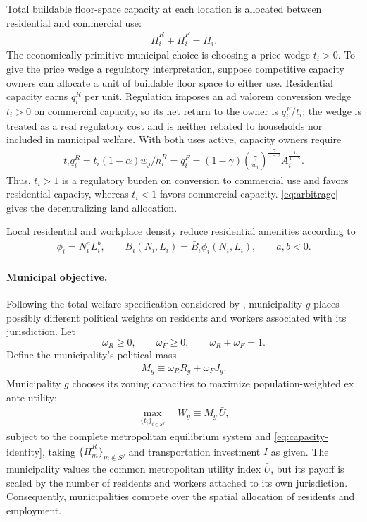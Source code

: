 \documentclass[12pt, a4paper]{article}
\theoremstyle{definition}
\theoremstyle{remark}
\begin{document}
Total buildable floor-space capacity at each location is allocated between residential and commercial use:
\begin{align}
    \label{eq:capacity-identity}
    \bar H_i^R+\bar H_i^F=\bar H_i.
\end{align}
The economically primitive municipal choice is choosing a price wedge $t_i>0$. To give the price wedge a regulatory interpretation, suppose competitive capacity owners can allocate a unit of buildable floor space to either use. Residential capacity earns $q_i^R$ per unit. Regulation imposes an ad valorem conversion wedge $t_i>0$ on commercial capacity, so its net return to the owner is $q_i^F/t_i$; the wedge is treated as a real regulatory cost and is neither rebated to households nor included in municipal welfare\citep{Glaeser2002-vq}. With both uses active, capacity owners require
\begin{align}
    \label{eq:arbitrage}
     t_{i}q_{i}^{R} = t_{i}(1-\alpha)w_{j}/h_{i}^{R}=q_{i}^{F}=
     (1-\gamma)\left(\frac{\gamma}{w_{i}}\right)^{\frac{\gamma}{1-\gamma}}A_{i}^{\frac{1}{1-\gamma}}.
\end{align}
Thus, $t_i>1$ is a regulatory burden on conversion to commercial use and favors residential capacity, whereas $t_i<1$ favors commercial capacity. \eqref{eq:arbitrage} gives the decentralizing land allocation.

Local residential and workplace density reduce residential amenities according to
\begin{align}
    \label{eq:local-congestion}
    \phi_i=N_i^aL_i^b,
    \qquad
    B_i(N_i,L_i)=\bar B_i \phi_i(N_i,L_i),
    \qquad
     a,b<0.
\end{align}

\paragraph{Municipal objective.}
Following the total-welfare specification considered by \citet{Bordeu2026-df}, municipality $g$ places possibly different political weights on residents and workers associated with its jurisdiction. Let
\[
\omega_R\geq0,
\qquad
\omega_F\geq0,
\qquad
\omega_R+\omega_F=1.
\]
Define the municipality's political mass
\begin{align}
    \label{eq:political-mass}
    M_g\equiv \omega_RR_g+\omega_FJ_g.
\end{align}
Municipality $g$ chooses its zoning capacities to maximize population-weighted ex ante utility:
\begin{align}
    \label{eq:municipal-problem}
    \max_{\{t_{i}\}_{i\in S^g}}
    \quad
    W_g
    \equiv
    M_g\,
    \bar U,
\end{align}
subject to the complete metropolitan equilibrium system and \eqref{eq:capacity-identity}, taking $\{\bar H_m^R\}_{m\notin S^g}$ and transportation investment $I$ as given.
The municipality values the common metropolitan utility index $\bar U$, but its payoff is scaled by the number of residents and workers attached to its own jurisdiction. Consequently, municipalities compete over the spatial allocation of residents and employment.
\end{document}
